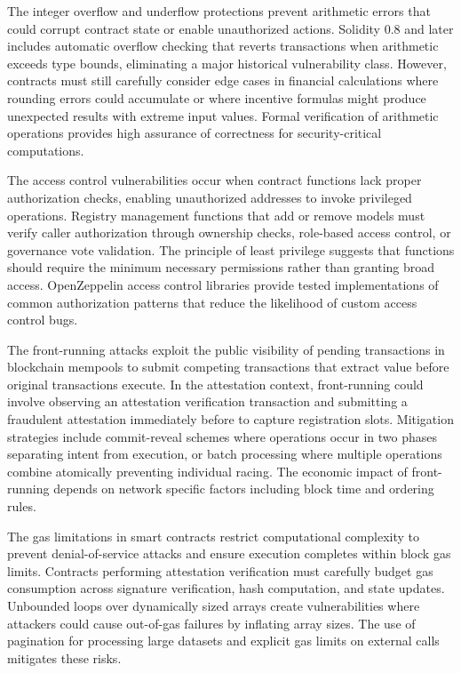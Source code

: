 The integer overflow and underflow protections prevent arithmetic errors that could corrupt contract state or enable unauthorized actions. Solidity 0.8 and later includes automatic overflow checking that reverts transactions when arithmetic exceeds type bounds, eliminating a major historical vulnerability class. However, contracts must still carefully consider edge cases in financial calculations where rounding errors could accumulate or where incentive formulas might produce unexpected results with extreme input values. Formal verification of arithmetic operations provides high assurance of correctness for security-critical computations.

The access control vulnerabilities occur when contract functions lack proper authorization checks, enabling unauthorized addresses to invoke privileged operations. Registry management functions that add or remove models must verify caller authorization through ownership checks, role-based access control, or governance vote validation. The principle of least privilege suggests that functions should require the minimum necessary permissions rather than granting broad access. OpenZeppelin access control libraries provide tested implementations of common authorization patterns that reduce the likelihood of custom access control bugs.

The front-running attacks exploit the public visibility of pending transactions in blockchain mempools to submit competing transactions that extract value before original transactions execute. In the attestation context, front-running could involve observing an attestation verification transaction and submitting a fraudulent attestation immediately before to capture registration slots. Mitigation strategies include commit-reveal schemes where operations occur in two phases separating intent from execution, or batch processing where multiple operations combine atomically preventing individual racing. The economic impact of front-running depends on network specific factors including block time and ordering rules.

The gas limitations in smart contracts restrict computational complexity to prevent denial-of-service attacks and ensure execution completes within block gas limits. Contracts performing attestation verification must carefully budget gas consumption across signature verification, hash computation, and state updates. Unbounded loops over dynamically sized arrays create vulnerabilities where attackers could cause out-of-gas failures by inflating array sizes. The use of pagination for processing large datasets and explicit gas limits on external calls mitigates these risks.

